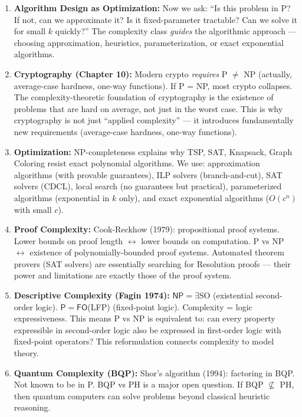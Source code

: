 \begin{enumerate}
\item \textbf{Algorithm Design as Optimization:} Now we ask: ``Is this problem in P? If not, can we approximate it? Is it fixed-parameter tractable? Can we solve it for small $k$ quickly?'' The complexity class \emph{guides} the algorithmic approach — choosing approximation, heuristics, parameterization, or exact exponential algorithms.

\item \textbf{Cryptography (Chapter 10):} Modern crypto \emph{requires} P $\neq$ NP (actually, average-case hardness, one-way functions). If P = NP, most crypto collapses. The complexity-theoretic foundation of cryptography is the existence of problems that are hard on average, not just in the worst case. This is why cryptography is not just ``applied complexity'' — it introduces fundamentally new requirements (average-case hardness, one-way functions).

\item \textbf{Optimization:} NP-completeness explains why TSP, SAT, Knapsack, Graph Coloring resist exact polynomial algorithms. We use: approximation algorithms (with provable guarantees), ILP solvers (branch-and-cut), SAT solvers (CDCL), local search (no guarantees but practical), parameterized algorithms (exponential in $k$ only), and exact exponential algorithms ($O(c^n)$ with small $c$).

\item \textbf{Proof Complexity:} Cook-Reckhow (1979): propositional proof systems. Lower bounds on proof length $\leftrightarrow$ lower bounds on computation. P vs NP $\leftrightarrow$ existence of polynomially-bounded proof systems. Automated theorem provers (SAT solvers) are essentially searching for Resolution proofs — their power and limitations are exactly those of the proof system.

\item \textbf{Descriptive Complexity (Fagin 1974):} $\mathsf{NP} = \exists$SO (existential second-order logic). $\mathsf{P} = \mathsf{FO}$(LFP) (fixed-point logic). Complexity = logic expressiveness. This means P vs NP is equivalent to: can every property expressible in second-order logic also be expressed in first-order logic with fixed-point operators? This reformulation connects complexity to model theory.

\item \textbf{Quantum Complexity (BQP):} Shor's algorithm (1994): factoring in BQP. Not known to be in P. BQP vs PH is a major open question. If BQP $\not\subseteq$ PH, then quantum computers can solve problems beyond classical heuristic reasoning.


\end{enumerate}
